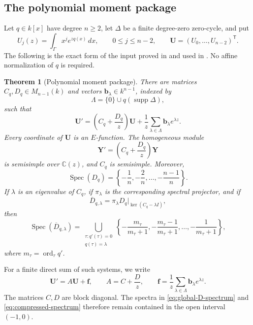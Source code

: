 \documentclass[11pt]{article}
\numberwithin{equation}{section}
\newtheorem{theorem}{Theorem}[section]
\theoremstyle{definition}
\theoremstyle{remark}
\newcommand{\C}{\mathbb C}
\newcommand{\Spec}{\operatorname{Spec}}
\newcommand{\ord}{\operatorname{ord}}
\begin{document}
\subsection{The polynomial moment package}

Let $q\in k[x]$ have degree $n\ge2$, let $\Delta$ be a finite degree-zero
zero-cycle, and put
\[
  U_j(z)=\int_\Gamma x^j e^{zq(x)}\,dx,
  \qquad 0\le j\le n-2,
  \qquad
  \mathbf U=(U_0,\ldots,U_{n-2})^{\mathsf T}.
\]
The following is the exact form of the input proved in \cite{LongEIT} and
used in \cite{LongLinearKZ}.  No affine normalization of $q$ is required.

\begin{theorem}[Polynomial moment package]\label{thm:moment-package}
There are matrices $C_q,D_q\in M_{n-1}(k)$ and vectors
$\mathbf b_\lambda\in k^{n-1}$, indexed by
\[
  \Lambda=\{0\}\cup q(\operatorname{supp}\Delta),
\]
such that
\begin{equation}\label{eq:moment-system}
  \mathbf U'
  =\left(C_q+\frac{D_q}{z}\right)\mathbf U
   +\frac1z\sum_{\lambda\in\Lambda}
      \mathbf b_\lambda e^{\lambda z}.
\end{equation}
Every coordinate of $\mathbf U$ is an $E$-function.  The homogeneous module
\begin{equation}\label{eq:homogeneous}
  \mathbf Y'=\left(C_q+\frac{D_q}{z}\right)\mathbf Y
\end{equation}
is semisimple over $\C(z)$, and $C_q$ is semisimple.  Moreover,
\begin{equation}\label{eq:global-D-spectrum}
  \Spec(D_q)=
  \left\{-\frac1n,-\frac2n,\ldots,-\frac{n-1}{n}\right\}.
\end{equation}
If $\lambda$ is an eigenvalue of $C_q$, if $\pi_\lambda$ is the corresponding
spectral projector, and if
\[
  \overline D_{q,\lambda}
  =\pi_\lambda D_q|_{\ker(C_q-\lambda I)},
\]
then
\begin{equation}\label{eq:compressed-spectrum}
  \Spec(\overline D_{q,\lambda})
  =\bigcup_{\substack{\tau:q'(\tau)=0\\q(\tau)=\lambda}}
    \left\{-\frac{m_\tau}{m_\tau+1},
    -\frac{m_\tau-1}{m_\tau+1},\ldots,
    -\frac1{m_\tau+1}\right\},
\end{equation}
where $m_\tau=\ord_\tau q'$.
\end{theorem}

For a finite direct sum of such systems, we write
\begin{equation}\label{eq:direct-system}
  \mathbf U'=A\mathbf U+\mathbf f,
  \qquad
  A=C+\frac Dz,
  \qquad
  \mathbf f=\frac1z\sum_{\lambda\in\Lambda}
      \mathbf b_\lambda e^{\lambda z}.
\end{equation}
The matrices $C,D$ are block diagonal.  The spectra in
\eqref{eq:global-D-spectrum} and \eqref{eq:compressed-spectrum} therefore
remain contained in the open interval $(-1,0)$.
\end{document}
